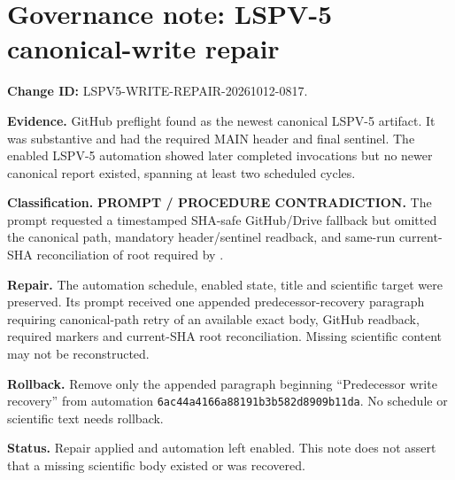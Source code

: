 \documentclass[11pt]{article}
\begin{document}
\section*{Governance note: LSPV-5 canonical-write repair}
\textbf{Change ID:} LSPV5-WRITE-REPAIR-20261012-0817.

\textbf{Evidence.} GitHub preflight found
 as the newest
canonical LSPV-5 artifact.  It was substantive and had the required MAIN
header and final sentinel.  The enabled LSPV-5 automation showed later
completed invocations but no newer canonical report existed, spanning at
least two scheduled cycles.

\textbf{Classification.} \textbf{PROMPT / PROCEDURE CONTRADICTION.}  The
prompt requested a timestamped SHA-safe GitHub/Drive fallback but omitted the
canonical  path,
mandatory header/sentinel readback, and same-run current-SHA reconciliation of
root  required by .

\textbf{Repair.} The automation schedule, enabled state, title and scientific
target were preserved.  Its prompt received one appended predecessor-recovery
paragraph requiring canonical-path retry of an available exact body, GitHub
readback, required markers and current-SHA root reconciliation.  Missing
scientific content may not be reconstructed.

\textbf{Rollback.} Remove only the appended paragraph beginning
``Predecessor write recovery'' from automation
\texttt{6ac44a4166a88191b3b582d8909b11da}.  No schedule or scientific text
needs rollback.

\textbf{Status.} Repair applied and automation left enabled.  This note does
not assert that a missing scientific body existed or was recovered.

\end{document}
